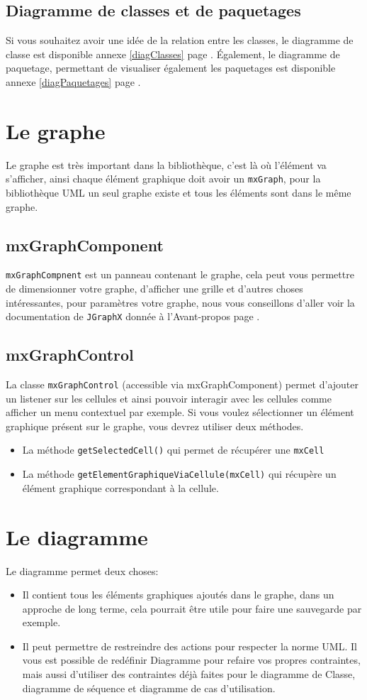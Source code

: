\documentclass[12pt,a4paper,oneside]{book}
\begin{document}
	\subsection{Diagramme de classes et de paquetages}
	Si vous souhaitez avoir une idée de la relation entre les classes, le diagramme de classe est disponible annexe \ref{diagClasses} page \pageref{diagClasses}. Également, le
	diagramme de paquetage, permettant de visualiser également les paquetages est disponible annexe \ref{diagPaquetages} page \pageref{diagPaquetages}.
	\section{Le graphe} \label{mxGraph}
	Le graphe est très important dans la bibliothèque, c'est là où l'élément va s'afficher, ainsi chaque élément graphique doit avoir un \texttt{mxGraph}, pour la bibliothèque
	UML un seul graphe existe et tous les éléments sont dans le même graphe.
	\subsection{mxGraphComponent}
	\texttt{mxGraphCompnent} est un panneau contenant le graphe, cela peut vous permettre de dimensionner votre graphe, d'afficher une grille et d'autres choses
	intéressantes, pour paramètres votre graphe, nous vous conseillons d'aller voir la documentation de \texttt{JGraphX} donnée à l'Avant-propos page \pageref{docDemonstrateur}.
	\subsection{mxGraphControl}
	La classe \texttt{mxGraphControl} (accessible via mxGraphComponent) permet d'ajouter un listener sur les cellules et ainsi pouvoir interagir avec les cellules comme
	afficher un menu contextuel par exemple. Si vous voulez sélectionner un élément graphique présent sur le graphe, vous devrez utiliser deux méthodes. 
	\begin{itemize}
		\item La méthode \texttt{getSelectedCell()} qui permet de récupérer une \texttt{mxCell}
		\item La méthode \texttt{getElementGraphiqueViaCellule(mxCell)} qui récupère un élément graphique correspondant à la cellule.
	\end{itemize}
	\section{Le diagramme}
	Le diagramme permet deux choses:
	\begin{itemize}
		\item Il contient tous les éléments graphiques ajoutés dans le graphe, dans un approche de long terme, cela pourrait être utile pour faire une sauvegarde par exemple.
		\item Il peut permettre de restreindre des actions pour respecter la norme UML. Il vous est possible de redéfinir Diagramme pour refaire vos propres contraintes, 
			mais aussi d'utiliser des contraintes déjà faites pour le diagramme de Classe, diagramme de séquence et diagramme de cas d'utilisation.
	\end{itemize}
\end{document}
